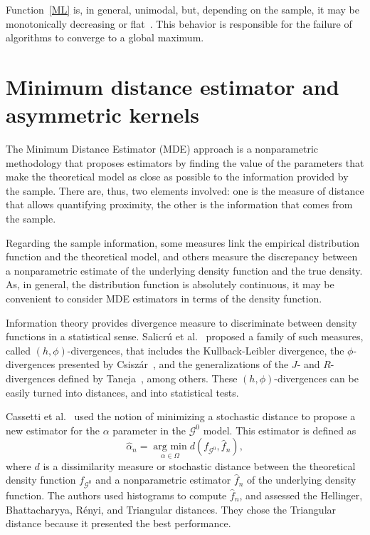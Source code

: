 \documentclass[twocolumn]{svjour3}
\newcommand{\argmin}{\operatorname*{\text{arg min }}}
\begin{document}
Function~\eqref{ML} is, in general, unimodal, but, depending on the sample, it may be monotonically decreasing or flat~\cite{FreryCribariSouza:JASP:04}. 
This behavior is responsible for the failure of algorithms to converge to a global maximum.


\section{Minimum distance estimator and asymmetric kernels}
\label{distancekernel}

The Minimum Distance Estimator (MDE) approach is a nonparametric methodology that proposes estimators by finding the value of the parameters that make the theoretical model as close as possible to the information provided by the sample. 
There are, thus, two elements involved: one is the measure of distance that allows quantifying proximity, the other is the information that comes from the sample.

Regarding the sample information, some measures link the empirical distribution function and the theoretical model, and others measure the discrepancy between a nonparametric estimate of the underlying density function and the true density. 
As, in general, the distribution function is absolutely continuous, it may be convenient to consider MDE estimators in terms of the density function. 

Information theory provides divergence measure to discriminate between density functions in a statistical sense. 
Salicr\'u et al.~\cite{Salicru1994} proposed a family of such measures, called $(h,\phi)$-divergences, that includes the Kullback-Leibler divergence,  
the $\phi$-divergences presented by Csisz\'ar~\cite{Csiszar1967}, 
and the generalizations of the $J$- and $R$-divergences defined by Taneja~\cite{Taneja1989}, among others.
These $(h,\phi)$-divergences can be easily turned into distances, and into statistical tests.

Cassetti et al.~\cite{APSAR2013ParameterEstimationStochasticDistances} used the notion of minimizing a stochastic distance to propose a new estimator for the $\alpha$ parameter in the $\mathcal{G}^0$ model. 
This estimator is defined as
\begin{equation}
\widehat{\alpha}_n=\argmin_{\alpha\in\Omega} d(f_{\mathcal{G}^0}, \widehat{f}_n),
\label{MDE}
\end{equation}
where $d$ is a dissimilarity measure or stochastic distance between the theoretical density function $f_{\mathcal{G}^0}$ and a nonparametric estimator $\widehat{f}_n$ of the underlying density function.
The authors used histograms to compute $\widehat{f}_n$, and assessed the Hellinger, Bhattacharyya, R\'enyi, and Triangular distances. 
They chose the Triangular distance because it presented the best performance.
 
\end{document}
